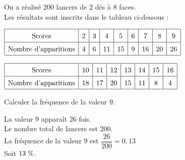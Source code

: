\begin{corrige}
    On a réalisé $200$ lancers de $2$ dés à $8$ faces.\\
    Les résultats sont inscrits dans le tableau ci-dessous :
    
    \medskip
    \hspace*{-5mm}
    $\def\arraystretch{1.5}\begin{array}{|c|c|c|c|c|c|c|c|c|c}
        \hline  \text{Scores}&2&3&4&5&6&7&8&9\\\hline
        \text{Nombre d'apparitions}&4&6&11&15&9&16&20&26\\\hline
    \end{array}$
    
    \medskip
    \hspace*{-5mm}
    $\def\arraystretch{1.5}\begin{array}{|c|c|c|c|c|c|c|c|c}\hline  \text{Scores}&10&11&12&13&14&15&16\\
    \hline \text{Nombre d'apparitions}&18&17&20&15&11&8&4\\
    \hline\end{array}$
    
    \medskip
     Calculer la fréquence de la valeur $9$.
     {\red    
    \begin{spacing}{1.5}
        La valeur $9$ apparaît $26$ fois.\\
        Le nombre total de lancers est $200$.\\
        La fréquence de la valeur $9$ est $\dfrac{26}{200}=0{,}13$\\
        Soit $13\thickspace\%$.
    \end{spacing} 
     }
\end{corrige}


